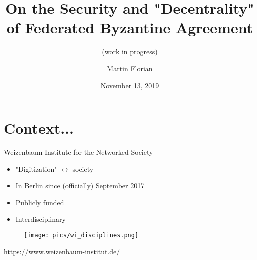 \documentclass{beamer}
\title{On the Security and "Decentrality" of Federated Byzantine Agreement}
\subtitle{(work in progress)}
\author{Martin Florian}
\date{November 13, 2019}
\newcommand{\darrow}{$\leftrightarrow$ }
\begin{document}
\maketitle
{}

\section{Context...}

\begin{frame}{Weizenbaum Institute for the Networked Society}
  \vspace{5ex}
  \begin{itemize}
    \item "Digitization" \darrow society
    \item In Berlin since (officially) September 2017
    \item Publicly funded
    \item \alert{Interdisciplinary}
  \end{itemize}
  \begin{figure}[htpb]
    \vspace{-5ex}
    \hspace{8ex}
    \texttt{[image: pics/wi\_disciplines.png]}
  \end{figure}
  \url{https://www.weizenbaum-institut.de/}
\end{frame}
\end{document}

